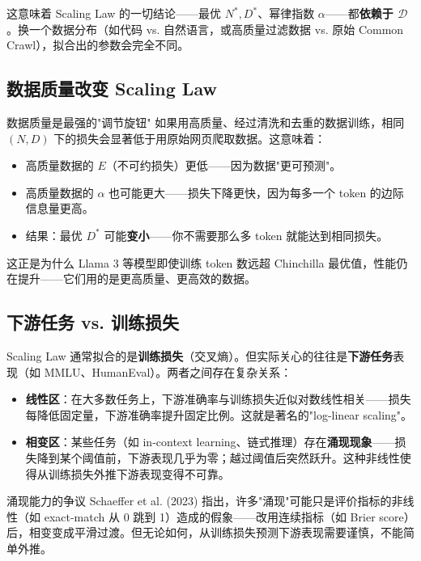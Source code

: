 \documentclass[a4paper]{article}
\begin{document}
这意味着 Scaling Law 的一切结论——最优 $N^*, D^*$、幂律指数 $\alpha$——都\textbf{依赖于 $\mathcal{D}$}。换一个数据分布（如代码 vs. 自然语言，或高质量过滤数据 vs. 原始 Common Crawl），拟合出的参数会完全不同。

\subsection{数据质量改变 Scaling Law}

\begin{warningbox}{数据质量是最强的"调节旋钮"}
如果用高质量、经过清洗和去重的数据训练，相同 $(N, D)$ 下的损失会显著低于用原始网页爬取数据。这意味着：
\begin{itemize}
\item 高质量数据的 $E$（不可约损失）更低——因为数据"更可预测"。
\item 高质量数据的 $\alpha$ 也可能更大——损失下降更快，因为每多一个 token 的边际信息量更高。
\item 结果：最优 $D^*$ 可能\textbf{变小}——你不需要那么多 token 就能达到相同损失。
\end{itemize}
这正是为什么 Llama 3 等模型即使训练 token 数远超 Chinchilla 最优值，性能仍在提升——它们用的是更高质量、更高效的数据。
\end{warningbox}

\subsection{下游任务 vs. 训练损失}

Scaling Law 通常拟合的是\textbf{训练损失}（交叉熵）。但实际关心的往往是\textbf{下游任务}表现（如 MMLU、HumanEval）。两者之间存在复杂关系：

\begin{itemize}
\item \textbf{线性区}：在大多数任务上，下游准确率与训练损失近似对数线性相关——损失每降低固定量，下游准确率提升固定比例。这就是著名的"log-linear scaling"。
\item \textbf{相变区}：某些任务（如 in-context learning、链式推理）存在\textbf{涌现现象}——损失降到某个阈值前，下游表现几乎为零；越过阈值后突然跃升。这种非线性使得从训练损失外推下游表现变得不可靠。
\end{itemize}

\begin{knowledgebox}{涌现能力的争议}
Schaeffer et al. (2023) 指出，许多"涌现"可能只是评价指标的非线性（如 exact-match 从 0 跳到 1）造成的假象——改用连续指标（如 Brier score）后，相变变成平滑过渡。但无论如何，从训练损失预测下游表现需要谨慎，不能简单外推。
\end{knowledgebox}
\end{document}
